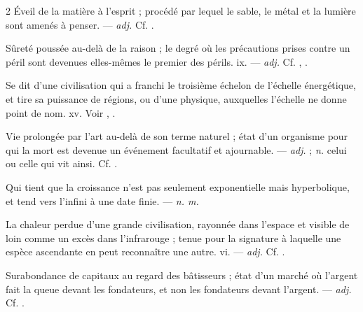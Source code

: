 \begin{multicols}{2}
 Éveil de la matière à l'esprit ; procédé par lequel le sable, le métal et la lumière sont amenés à penser. —  \textit{adj.} Cf. .

 Sûreté poussée au-delà de la raison ; le degré où les précautions prises contre un péril sont devenues elles-mêmes le premier des périls.   ix. —  \textit{adj.} Cf. , .

 Se dit d'une civilisation qui a franchi le troisième échelon de l'échelle énergétique, et tire sa puissance de régions, ou d'une physique, auxquelles l'échelle ne donne point de nom.   xv. Voir , .

 Vie prolongée par l'art au-delà de son terme naturel ; état d'un organisme pour qui la mort est devenue un événement facultatif et ajournable. —  \textit{adj.} ;  \textit{n.} celui ou celle qui vit ainsi. Cf. .

 Qui tient que la croissance n'est pas seulement exponentielle mais hyperbolique, et tend vers l'infini à une date finie. —  \textit{n. m.}

 La chaleur perdue d'une grande civilisation, rayonnée dans l'espace et visible de loin comme un excès dans l'infrarouge ; tenue pour la signature à laquelle une espèce ascendante en peut reconnaître une autre.   vi. —  \textit{adj.} Cf. .

 Surabondance de capitaux au regard des bâtisseurs ; état d'un marché où l'argent fait la queue devant les fondateurs, et non les fondateurs devant l'argent.   —  \textit{adj.} Cf. .


\end{multicols}
